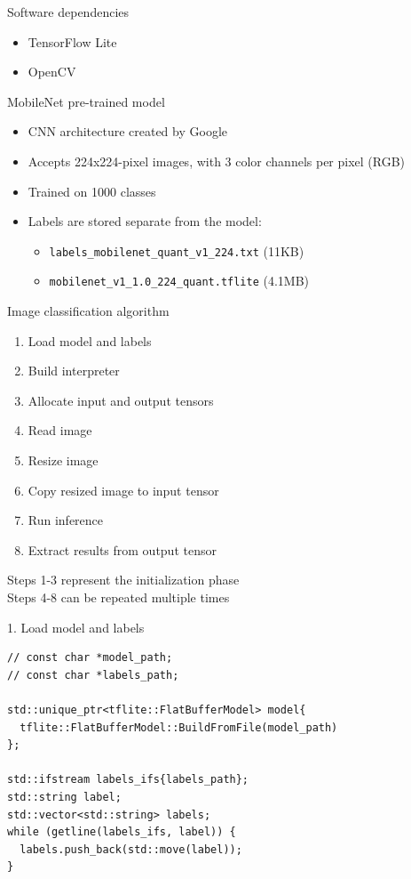 \begin{frame}{Software dependencies}
  \begin{itemize}
	\item TensorFlow Lite
	\item OpenCV
  \end{itemize}
\end{frame}

\begin{frame}{MobileNet pre-trained model}
  \begin{itemize}
	\item CNN architecture created by Google
	\item Accepts 224x224-pixel images, with 3 color channels per pixel (RGB)
	\item Trained on 1000 classes
	\item Labels are stored separate from the model:
	  \begin{itemize}
		\item \texttt{labels\_mobilenet\_quant\_v1\_224.txt} (11KB)
		\item \texttt{mobilenet\_v1\_1.0\_224\_quant.tflite} (4.1MB)
	  \end{itemize}
  \end{itemize}
\end{frame}

\begin{frame}{Image classification algorithm}
  \begin{enumerate}
	\item Load model and labels
	\item Build interpreter
	\item Allocate input and output tensors
	\item Read image
	\item Resize image
	\item Copy resized image to input tensor
	\item Run inference
	\item Extract results from output tensor
  \end{enumerate}
\bigskip
Steps 1-3 represent the initialization phase \\
Steps 4-8 can be repeated multiple times
\end{frame}

\begin{frame}[fragile]{1. Load model and labels}
  \lstset{basicstyle=\ttfamily\small, numbers=left, columns=fullflexible}
  \begin{lstlisting}
// const char *model_path;
// const char *labels_path;

std::unique_ptr<tflite::FlatBufferModel> model{
  tflite::FlatBufferModel::BuildFromFile(model_path)
};

std::ifstream labels_ifs{labels_path};
std::string label;
std::vector<std::string> labels;
while (getline(labels_ifs, label)) {
  labels.push_back(std::move(label));
}
  \end{lstlisting}
\end{frame}

